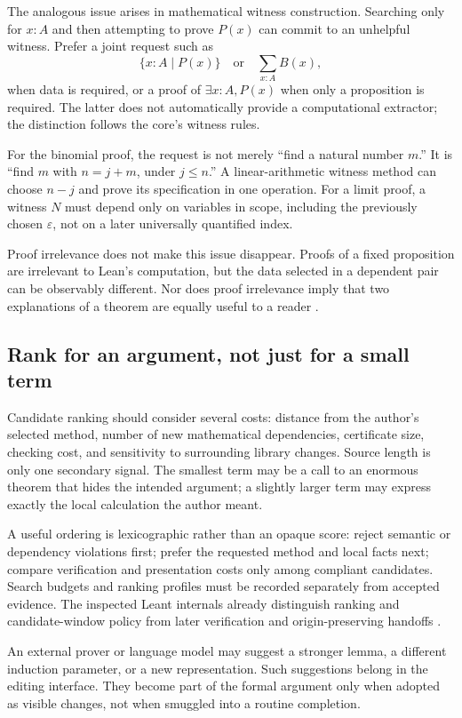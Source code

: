 \documentclass[11pt,a4paper]{article}
\begin{document}
The analogous issue arises in mathematical witness construction. Searching only for $x:A$ and then attempting to prove $P(x)$ can commit to an unhelpful witness. Prefer a joint request such as
\[
 \{x:A\mid P(x)\}
 \quad\text{or}\quad
 \sum_{x:A}B(x),
\]
when data is required, or a proof of $\exists x:A,P(x)$ when only a proposition is required. The latter does not automatically provide a computational extractor; the distinction follows the core's witness rules.

For the binomial proof, the request is not merely ``find a natural number $m$.'' It is ``find $m$ with $n=j+m$, under $j\le n$.'' A linear-arithmetic witness method can choose $n-j$ and prove its specification in one operation. For a limit proof, a witness $N$ must depend only on variables in scope, including the previously chosen $\varepsilon$, not on a later universally quantified index.

Proof irrelevance does not make this issue disappear. Proofs of a fixed proposition are irrelevant to Lean's computation, but the data selected in a dependent pair can be observably different. Nor does proof irrelevance imply that two explanations of a theorem are equally useful to a reader \cite{leanprop}.

\subsection{Rank for an argument, not just for a small term}

Candidate ranking should consider several costs: distance from the author's selected method, number of new mathematical dependencies, certificate size, checking cost, and sensitivity to surrounding library changes. Source length is only one secondary signal. The smallest term may be a call to an enormous theorem that hides the intended argument; a slightly larger term may express exactly the local calculation the author meant.

A useful ordering is lexicographic rather than an opaque score: reject semantic or dependency violations first; prefer the requested method and local facts next; compare verification and presentation costs only among compliant candidates. Search budgets and ranking profiles must be recorded separately from accepted evidence. The inspected Leant internals already distinguish ranking and candidate-window policy from later verification and origin-preserving handoffs \cite{leantinternals}.

An external prover or language model may suggest a stronger lemma, a different induction parameter, or a new representation. Such suggestions belong in the editing interface. They become part of the formal argument only when adopted as visible changes, not when smuggled into a routine completion.
\end{document}
